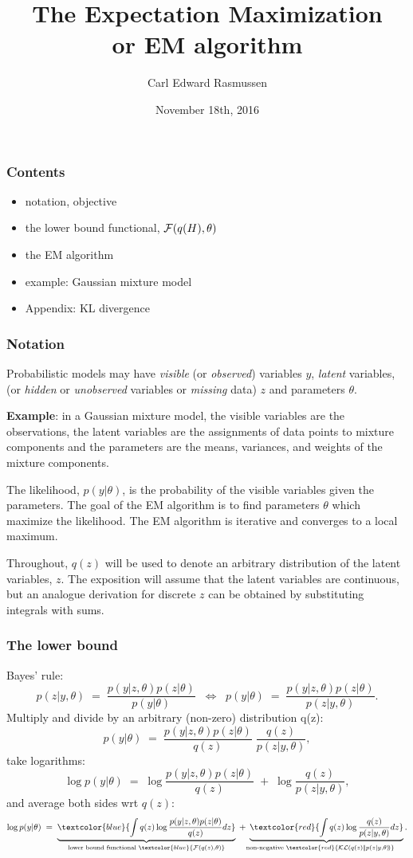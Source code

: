 \documentclass[10pt]{beamer}
\title[The EM algorithm]{The Expectation Maximization\\ or EM algorithm}
\author{Carl Edward Rasmussen}
\date{November 18th, 2016}
\newcommand{\Red}{\textcolor{red}}
\newcommand{\Blue}{\textcolor{blue}}
\newcommand{\y}{y}
\newcommand{\z}{z}
\begin{document}
\begin{frame}
\titlepage

\end{frame}

\begin{frame}
\frametitle{Contents}

\begin{itemize}
\item notation, objective
\item the lower bound functional, ${\cal F}(q(H),\theta)$
\item the EM algorithm
\item example: Gaussian mixture model
\item Appendix: KL divergence
\end{itemize}
\end{frame}

\begin{frame}
\frametitle{Notation}

Probabilistic models may have \emph{visible} (or \emph{observed}) variables $\y$, \emph{latent} variables, (or \emph{hidden} or \emph{unobserved}  variables or \emph{missing} data) $\z$ and parameters $\theta$.

{\bf Example}: in a Gaussian mixture model, the visible variables are the observations, the latent variables are the assignments of data points to mixture components and the parameters are the means, variances, and weights of the mixture components.

The likelihood, $p(\y|\theta)$, is the probability of the visible variables given the parameters. The goal of the EM algorithm is to find parameters $\theta$ which maximize the likelihood. The EM algorithm is iterative and converges to a local maximum.

Throughout, $q(\z)$ will be used to denote an arbitrary distribution of the latent variables, $\z$. The exposition will assume that the latent variables are continuous, but an analogue derivation for discrete $\z$ can be obtained by substituting integrals with sums.
\end{frame}

\begin{frame}
\frametitle{The lower bound}

Bayes' rule:
\[
p(\z|\y,\theta)\;=\;\frac{p(\y|\z,\theta)p(\z|\theta)}{p(\y|\theta)}\;\;\Leftrightarrow\;\;
p(\y|\theta)\;=\;\frac{p(\y|\z,\theta)p(\z|\theta)}{p(\z|\y,\theta)}.
\]
Multiply and divide by an arbitrary (non-zero) distribution q(\z):
\[
p(\y|\theta)\;=\;\frac{p(\y|\z,\theta)p(\z|\theta)}{q(\z)}\;\frac{q(\z)}{p(\z|\y,\theta)},
\]
take logarithms:
\[
\log p(\y|\theta)\;=\;\log\frac{p(\y|\z,\theta)p(\z|\theta)}{q(\z)}\;+\;\log\frac{q(\z)}{p(\z|\y,\theta)},
\] 
and average both sides wrt $q(\z)$:
\[
\log p(\y|\theta)\;=\;\underbrace{\Blue{\int q(\z)\log\frac{p(\y|\z,\theta)p(\z|\theta)}{q(\z)}d\z}}_{\text{lower bound functional\ }\Blue{{\cal F}(q(\z),\theta)}}\;+\;
\underbrace{\Red{\int q(\z)\log\frac{q(\z)}{p(\z|\y,\theta)}d\z}}_{\!\!\!\!\!\!\!\!\!\!\!\text{non-negative\ }\Red{{\cal KL}(q(\z)|\!|p(\z|\y,\theta)\!)}}.
\]
\end{frame}
\end{document}
